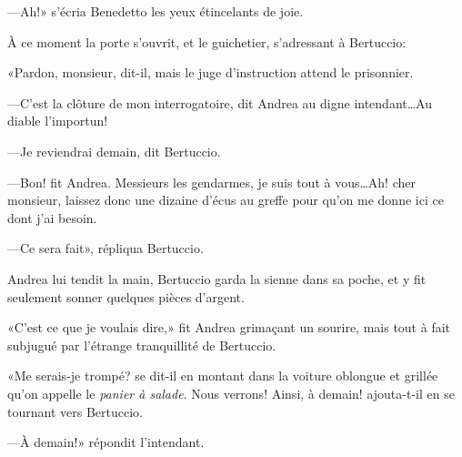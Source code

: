 —Ah!» s'écria Benedetto les yeux étincelants de joie. 

À ce moment la porte s'ouvrit, et le guichetier, s'adressant à Bertuccio: 

«Pardon, monsieur, dit-il, mais le juge d'instruction attend le prisonnier. 

—C'est la clôture de mon interrogatoire, dit Andrea au digne intendant\dots Au diable l'importun! 

—Je reviendrai demain, dit Bertuccio. 

—Bon! fit Andrea. Messieurs les gendarmes, je suis tout à vous\dots Ah! cher monsieur, laissez donc une dizaine d'écus au greffe pour qu'on me donne ici ce dont j'ai besoin. 

—Ce sera fait», répliqua Bertuccio. 

Andrea lui tendit la main, Bertuccio garda la sienne dans sa poche, et y fit seulement sonner quelques pièces d'argent. 

«C'est ce que je voulais dire,» fit Andrea grimaçant un sourire, mais tout à fait subjugué par l'étrange tranquillité de Bertuccio. 

«Me serais-je trompé? se dit-il en montant dans la voiture oblongue et grillée qu'on appelle le \textit{panier à salade}. Nous verrons! Ainsi, à demain! ajouta-t-il en se tournant vers Bertuccio. 

—À demain!» répondit l'intendant. 
